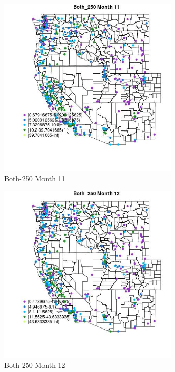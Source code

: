 \begin{figure} 
\centering  
\includegraphics[width=0.77\textwidth]{Code_Outputs/ML_input_report_ML_input_PM25_Step5_part_d_de_duplicated_aves_ML_input_MapObsMo11Both_250.jpg} 
\caption{\label{fig:ML_input_report_ML_input_PM25_Step5_part_d_de_duplicated_aves_ML_inputMapObsMo11Both_250}Both-250 Month 11} 
\end{figure} 
 

\begin{figure} 
\centering  
\includegraphics[width=0.77\textwidth]{Code_Outputs/ML_input_report_ML_input_PM25_Step5_part_d_de_duplicated_aves_ML_input_MapObsMo12Both_250.jpg} 
\caption{\label{fig:ML_input_report_ML_input_PM25_Step5_part_d_de_duplicated_aves_ML_inputMapObsMo12Both_250}Both-250 Month 12} 
\end{figure} 
 

